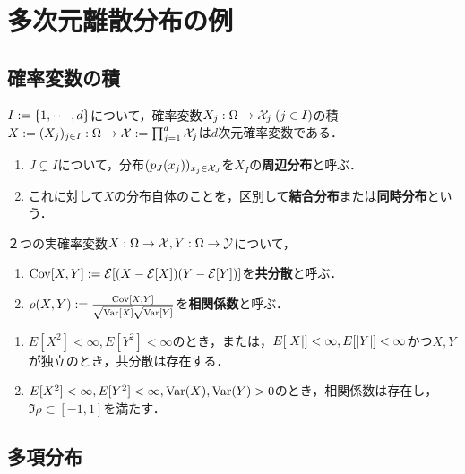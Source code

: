 \documentclass[uplatex,dvipdfmx]{jsreport}
\begin{document}
\section{多次元離散分布の例}

\subsection{確率変数の積}

\begin{definition}
    $I:=\left\{1,\cdots,d\right\}$について，確率変数$X_j:\Omega\to\mathcal{X}_j\;(j\in I)$の積$X:=(X_j)_{j\in I}:\Omega\to\mathcal{X}:=\prod_{j=1}^d\mathcal{X}_j$は$d$次元確率変数である．
    \begin{enumerate}
        \item $J\subsetneq I$について，分布$(p_J(x_j))_{x_j\in\mathcal{X}_J}$を$X_I$の\textbf{周辺分布}と呼ぶ．
        \item これに対して$X$の分布自体のことを，区別して\textbf{結合分布}または\textbf{同時分布}という．
    \end{enumerate}
\end{definition}

\begin{definition}
    ２つの実確率変数$X:\Omega\to\mathcal{X},Y:\Omega\to\mathcal{Y}$について，
    \begin{enumerate}
        \item $\mathrm{Cov}[X,Y]:=\mathcal{E}[(X-\mathcal{E}[X])(Y-\mathcal{E}[Y])]$を\textbf{共分散}と呼ぶ．
        \item $\rho(X,Y):=\frac{\mathrm{Cov}[X,Y]}{\sqrt{\mathrm{Var}[X]}\sqrt{\mathrm{Var}[Y]}}$を\textbf{相関係数}と呼ぶ．
    \end{enumerate}
\end{definition}

\begin{lemma}\mbox{}
    \begin{enumerate}
        \item $E[X^2]<\infty,E[Y^2]<\infty$のとき，または，$E[\lvert X\rvert]<\infty,E[\lvert Y\rvert]<\infty$かつ$X,Y$が独立のとき，共分散は存在する．
        \item $E[X^2]<\infty,E[Y^2]<\infty,\mathrm{Var}(X),\mathrm{Var}(Y)>0$のとき，相関係数は存在し，$\Im\rho\subset[-1,1]$を満たす．
    \end{enumerate}
\end{lemma}

\subsection{多項分布}
\end{document}
